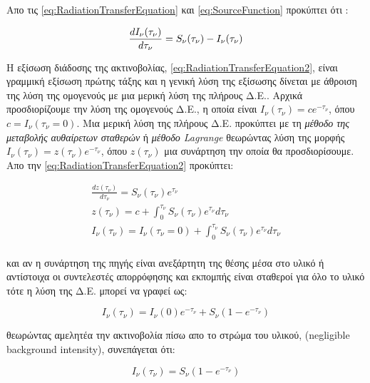 Απο τις \eqref{eq:RadiationTransferEquation} και \eqref{eq:SourceFunction} προκύπτει ότι :

\begin{equation}\label{eq:RadiationTransferEquation2}
  \frac{dI_{\nu}(\tau_{\nu})}{d\tau_{\nu}}= S_{\nu}(\tau_{\nu}) - I_{\nu}(\tau_{\nu})\\
\end{equation}

Η εξίσωση διάδοσης της ακτινοβολίας, \eqref{eq:RadiationTransferEquation2}, είναι γραμμική εξίσωση πρώτης τάξης και η γενική λύση της εξίσωσης δίνεται με άθροιση της λύση της ομογενούς με μια μερική λύση της πλήρους Δ.Ε.. Αρχικά προσδιορίζουμε την λύση της ομογενούς Δ.Ε., η οποία είναι $I_{\nu}(\tau_{\nu}) = c e^{-\tau_{\nu}}$, όπου $c = I_{\nu}(\tau_{\nu}=0)$. Μια μερική λύση της πλήρους Δ.Ε. προκύπτει με τη {\it μέθοδο της μεταβολής αυθαίρετων σταθερών} ή {\it μέθοδο {\en Lagrange}} θεωρώντας λύση της μορφής $I_{\nu}(\tau_{\nu}) = z(\tau_{\nu}) e^{-\tau_{\nu}}$, όπου $z(\tau_{\nu})$ μια συνάρτηση την οποία θα προσδιορίσουμε. Απο την \eqref{eq:RadiationTransferEquation2} προκύπτει:

\begin{align*}
\frac{dz(\tau_{\nu})}{d\tau_{\nu}} = S_{\nu}(\tau_{\nu}) e^{\tau_{\nu}}\\
z(\tau_{\nu}) = c + \int_{0}^{\tau_{\nu}} S_{\nu}(\tau_{\nu})e^{\tau_{\nu}} d\tau_{\nu}\\
I_{\nu}(\tau_{\nu}) = I_{\nu}(\tau_{\nu}=0) + \int_{0}^{\tau_{\nu}} S_{\nu}(\tau_{\nu})e^{\tau_{\nu}} d\tau_{\nu}\\ 
\end{align*}

και αν η συνάρτηση της πηγής είναι ανεξάρτητη της θέσης μέσα στο υλικό ή αντίστοιχα οι συντελεστές απορρόφησης και εκπομπής είναι σταθεροί για όλο το υλικό τότε η λύση της Δ.Ε. μπορεί να γραφεί ως:

\begin{equation}\label{eq:RadiationTransferEquation3}
I_{\nu}(\tau_{\nu}) = I_{\nu}(0)e^{-\tau_{\nu}} + S_{\nu}(1-e^{-\tau_{\nu}})
\end{equation}

θεωρώντας αμελητέα την ακτινοβολία πίσω απο το στρώμα του υλικού, ({\en negligible background intensity}), συνεπάγεται ότι:

\begin{equation}\label{eq:RadiationTransferEquation4}
I_{\nu}(\tau_{\nu}) =  S_{\nu}(1-e^{-\tau_{\nu}})
\end{equation}

